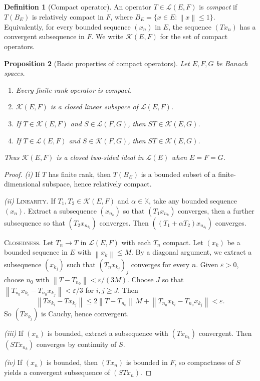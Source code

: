 \documentclass[a4paper,12pt]{book}
\newcommand{\K}{\mathbb{K}}
\newcommand{\norm}[1]{\left\| #1 \right\|}
\theoremstyle{definition}
\newtheorem{definition}{Definition}[chapter]
\theoremstyle{plain}
\newtheorem{proposition}[definition]{Proposition}
\theoremstyle{remark}
\begin{document}
\begin{definition}[Compact operator]\label{def:compact-op}
An operator $T\in\mathcal{L}(E,F)$ is \emph{compact} if $T(B_E)$ is relatively
compact in $F$, where $B_E=\{x\in E:\norm{x}\leq 1\}$. Equivalently, for every
bounded sequence $(x_n)$ in $E$, the sequence $(Tx_n)$ has a convergent
subsequence in $F$. We write $\mathcal{K}(E,F)$
for the set of compact operators.
\end{definition}

\begin{proposition}[Basic properties of compact operators]
\label{prop:compact-basic}
Let $E,F,G$ be Banach spaces.
\begin{enumerate}[label=(\roman*)]
  \item Every finite-rank operator is compact.
  \item $\mathcal{K}(E,F)$ is a closed linear subspace of $\mathcal{L}(E,F)$.
  \item If $T\in\mathcal{K}(E,F)$ and $S\in\mathcal{L}(F,G)$, then
        $ST\in\mathcal{K}(E,G)$.
  \item If $T\in\mathcal{L}(E,F)$ and $S\in\mathcal{K}(F,G)$, then
        $ST\in\mathcal{K}(E,G)$.
\end{enumerate}
Thus $\mathcal{K}(E,F)$ is a closed two-sided ideal in $\mathcal{L}(E)$ when
$E=F=G$.
\end{proposition}

\begin{proof}
\emph{(i)} If $T$ has finite rank, then $T(B_E)$ is a bounded subset of a
finite-dimensional subspace, hence relatively compact.

\emph{(ii)} \textsc{Linearity.} If $T_1,T_2\in\mathcal{K}(E,F)$ and
$\alpha\in\K$, take any bounded sequence $(x_n)$. Extract a subsequence
$(x_{n_k})$ so that $(T_1 x_{n_k})$ converges, then a further subsequence so
that $(T_2 x_{n_{k_l}})$ converges. Then $((T_1+\alpha T_2)x_{n_{k_l}})$
converges.

\textsc{Closedness.}
Let $T_n\to T$ in $\mathcal{L}(E,F)$ with each $T_n$ compact. Let $(x_k)$ be
a bounded sequence in $E$ with $\norm{x_k}\leq M$. By a diagonal argument, we
extract a subsequence $(x_{k_j})$ such that $(T_n x_{k_j})_j$ converges for
every $n$. Given $\varepsilon>0$, choose $n_0$ with
$\norm{T-T_{n_0}}<\varepsilon/(3M)$. Choose $J$ so that
$\norm{T_{n_0}x_{k_i}-T_{n_0}x_{k_j}}<\varepsilon/3$ for $i,j\geq J$. Then
\[
  \norm{Tx_{k_i}-Tx_{k_j}}
  \leq 2\norm{T-T_{n_0}}\,M + \norm{T_{n_0}x_{k_i}-T_{n_0}x_{k_j}}
  < \varepsilon.
\]
So $(Tx_{k_j})$ is Cauchy, hence convergent.

\emph{(iii)} If $(x_n)$ is bounded, extract a subsequence with
$(Tx_{n_k})$ convergent. Then $(STx_{n_k})$ converges by continuity of $S$.

\emph{(iv)} If $(x_n)$ is bounded, then $(Tx_n)$ is bounded in $F$, so
compactness of $S$ yields a convergent subsequence of $(STx_n)$.
\end{proof}
\end{document}

